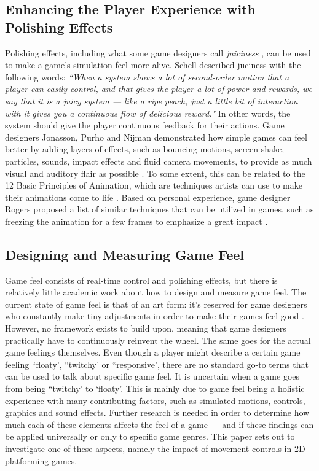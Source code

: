 \subsection{Enhancing the Player Experience with Polishing Effects}
Polishing effects, including what some game designers call \textit{juiciness} \cite{juice3}, can be used to make a game's simulation feel more alive. Schell described juciness with the following words: \textit{``When a system shows a lot of second-order motion that a player can easily control, and that gives the player a lot of power and rewards, we say that it is a juicy system --- like a ripe peach, just a little bit of interaction with it gives you a continuous flow of delicious reward."} \cite{schell_art_2008} In other words, the system should give the player continuous feedback for their actions. Game designers Jonasson, Purho and Nijman demonstrated how simple games can feel better by adding layers of effects, such as bouncing motions, screen shake, particles, sounds, impact effects and fluid camera movements, to provide as much visual and auditory flair as possible \cite{juice1, juice2}. To some extent, this can be related to the 12 Basic Principles of Animation, which are techniques artists can use to make their animations come to life \cite{animation}. Based on personal experience, game designer Rogers proposed a list of similar techniques that can be utilized in games, such as freezing the animation for a few frames to emphasize a great impact \cite{sticky}.


\subsection{Designing and Measuring Game Feel}
Game feel consists of real-time control and polishing effects, but there is relatively little academic work about how to design and measure game feel. The current state of game feel is that of an art form: it's reserved for game designers who constantly make tiny adjustments in order to make their games feel good \cite{meatboy1, meatboy2, juicyBeast, gameFeelTips}. However, no framework exists to build upon, meaning that game designers practically have to continuously reinvent the wheel. The same goes for the actual game feelings themselves. Even though a player might describe a certain game feeling ``floaty', ``twitchy' or ``responsive', there are no standard go-to terms that can be used to talk about specific game feel. It is uncertain when a game goes from being ``twitchy' to `floaty'. This is mainly due to game feel being a holistic experience with many contributing factors, such as simulated motions, controls, graphics and sound effects. Further research is needed in order to determine how much each of these elements affects the feel of a game --- and if these findings can be applied universally or only to specific game genres. This paper sets out to investigate one of these aspects, namely the impact of movement controls in 2D platforming games.

